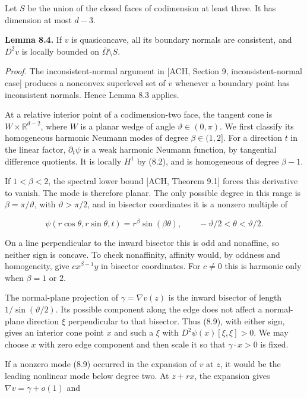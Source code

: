 \documentclass[11pt]{article}
\begin{document}
Let \(S\) be the union of the closed faces of codimension at least
three. It has dimension at most \(d-3\).

\textbf{Lemma 8.4.} If \(v\) is quasiconcave, all its boundary normals
are consistent, and \(D^2v\) is locally bounded on
\(\overline\Omega\setminus S\).

\emph{Proof.} The inconsistent-normal argument in {[}ACH, Section 9,
inconsistent-normal case{]} produces a nonconvex superlevel set of \(v\)
whenever a boundary point has inconsistent normals. Hence Lemma 8.3
applies.

At a relative interior point of a codimension-two face, the tangent cone
is \(W\times\mathbb R^{d-2}\), where \(W\) is a planar wedge of angle
\(\vartheta\in(0,\pi)\). We first classify its homogeneous harmonic
Neumann modes of degree \(\beta\in(1,2]\). For a direction \(t\) in the
linear factor, \(\partial_t\psi\) is a weak harmonic Neumann function,
by tangential difference quotients. It is locally \(H^1\) by (8.2), and
is homogeneous of degree \(\beta-1\).

If \(1<\beta<2\), the spectral lower bound {[}ACH, Theorem 9.1{]} forces
this derivative to vanish. The mode is therefore planar. The only
possible degree in this range is \(\beta=\pi/\vartheta\), with
\(\vartheta>\pi/2\), and in bisector coordinates it is a nonzero
multiple of

\[
\psi(r\cos\theta,r\sin\theta,t)
   =r^\beta\sin(\beta\theta),
\qquad -\vartheta/2<\theta<\vartheta/2.
\tag{8.9}
\]

On a line perpendicular to the inward bisector this is odd and
nonaffine, so neither sign is concave. To check nonaffinity, affinity
would, by oddness and homogeneity, give \(c x^{\beta-1}y\) in bisector
coordinates. For \(c\ne0\) this is harmonic only when \(\beta=1\) or
\(2\).

The normal-plane projection of \(\gamma=\nabla v(z)\) is the inward
bisector of length \(1/\sin(\vartheta/2)\). Its possible component along
the edge does not affect a normal-plane direction \(\xi\) perpendicular
to that bisector. Thus (8.9), with either sign, gives an interior cone
point \(x\) and such a \(\xi\) with \(D^2\psi(x)[\xi,\xi]>0\). We may
choose \(x\) with zero edge component and then scale it so that
\(\gamma\cdot x>0\) is fixed.

If a nonzero mode (8.9) occurred in the expansion of \(v\) at \(z\), it
would be the leading nonlinear mode below degree two. At \(z+rx\), the
expansion gives \(\nabla v=\gamma+o(1)\) and
\end{document}
